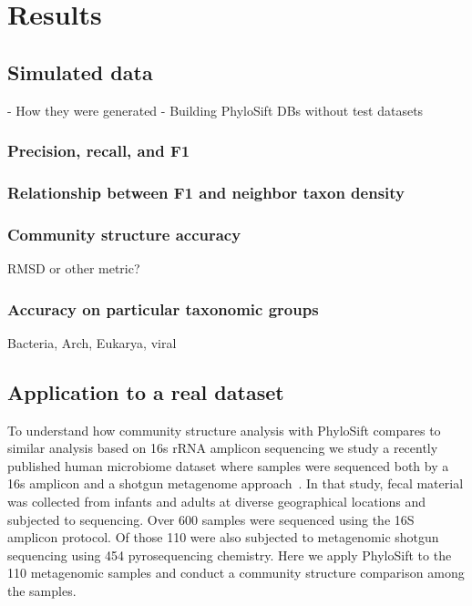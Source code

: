 \documentclass[10pt]{article}
\begin{document}
\section*{Results}



\subsection*{Simulated data}
    - How they were generated
    - Building PhyloSift DBs without test datasets
\subsubsection*{Precision, recall, and F1}
\subsubsection*{Relationship between F1 and neighbor taxon density}

\subsubsection*{Community structure accuracy}
RMSD or other metric?

\subsubsection*{Accuracy on particular taxonomic groups}
Bacteria, Arch, Eukarya, viral

\subsection*{Application to a real dataset}

To understand how community structure analysis with PhyloSift compares to similar analysis based on 16s rRNA amplicon sequencing we study a recently published human microbiome dataset where samples were sequenced both by a 16s amplicon and a shotgun metagenome approach~\cite{Yugocrazy2012}.
In that study, fecal material was collected from infants and adults at diverse geographical locations and subjected to sequencing.
Over 600 samples were sequenced using the 16S amplicon protocol.
Of those 110 were also subjected to metagenomic shotgun sequencing using 454 pyrosequencing chemistry.
Here we apply PhyloSift to the 110 metagenomic samples and conduct a community structure comparison among the samples.
\end{document}
